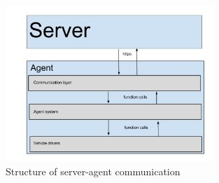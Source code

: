 \begin{figure}[H]
    \centering
    \includegraphics[width=0.7\textwidth]{graphics/Agent_server_communication.png} 
    \caption{Structure of server-agent communication}
    \label{fig:agent_server_communication}
\end{figure}


